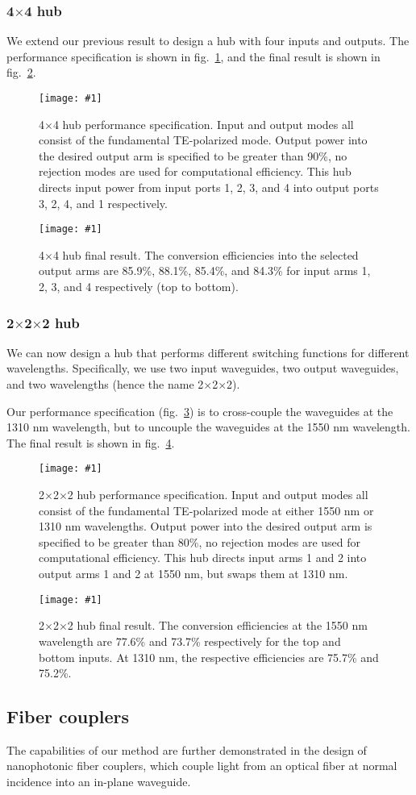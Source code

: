 \documentclass[letterpaper,10pt]{article}
\newcommand{\myfig}[2]{
    \begin{figure}[!h]
    \begin{centering}
    \texttt{[image: \#1]}
    \caption{#2}\label{#1}
    \end{centering}
    \end{figure}
}
\newcommand{\fig}[1]{fig.~\ref{#1}}
\begin{document}
\subsubsection{4$\times$4 hub}
We extend our previous result to design a hub with four inputs and outputs.
The performance specification is shown in \fig{3Db_hub_4x4},
    and the final result is shown in \fig{hub_4x4_comb}.

\myfig{3Db_hub_4x4}
    {4$\times$4 hub performance specification.
    Input and output modes all consist of the fundamental TE-polarized mode.
    Output power into the desired output arm is specified to be greater than 90\%,
        no rejection modes are used for computational efficiency.
    This hub directs input power from input ports 1, 2, 3, and 4
    into output ports 3, 2, 4, and 1 respectively.}
\myfig{hub_4x4_comb}
    {4$\times$4 hub final result.
    The conversion efficiencies into the selected output arms
        are 85.9\%, 88.1\%, 85.4\%, and 84.3\% for
        input arms 1, 2, 3, and 4 respectively (top to bottom).}

\subsubsection{2$\times$2$\times$2 hub}
We can now design a hub that performs 
    different switching functions for different wavelengths.
Specifically, we use two input waveguides, two output waveguides,
    and two wavelengths (hence the name 2$\times$2$\times$2).

Our performance specification (\fig{3Db_hub_2x2x2}) is
    to cross-couple the waveguides at the 1310 nm wavelength,
    but to uncouple the waveguides at the 1550 nm wavelength.
The final result is shown in \fig{hub_2x2x2}.
\myfig{3Db_hub_2x2x2}
    {2$\times$2$\times$2 hub performance specification.
    Input and output modes all consist of the fundamental TE-polarized mode
        at either 1550 nm or 1310 nm wavelengths.
    Output power into the desired output arm is specified to be greater than 80\%,
        no rejection modes are used for computational efficiency.
    This hub directs input arms 1 and 2 into output arms 1 and 2 at 1550 nm,
        but swaps them at 1310 nm.}
\myfig{hub_2x2x2}
    {2$\times$2$\times$2 hub final result.
    The conversion efficiencies at the 1550 nm wavelength 
        are 77.6\% and 73.7\% respectively for the top and bottom inputs.
    At 1310 nm, the respective efficiencies are 75.7\% and 75.2\%.}

\subsection{Fiber couplers}
The capabilities of our method are further demonstrated
    in the design of nanophotonic fiber couplers,
    which couple light from an optical fiber at normal incidence
    into an in-plane waveguide\cite{baets}.
\end{document}
